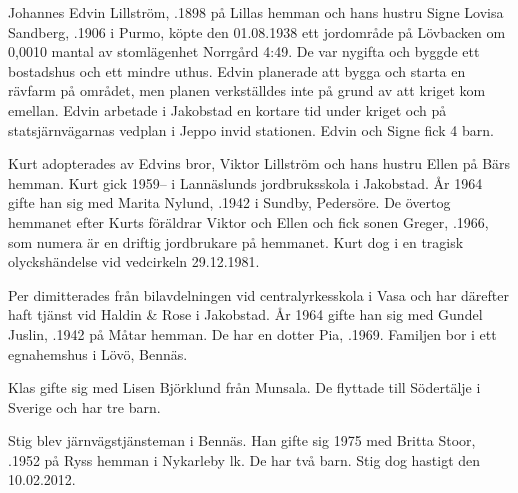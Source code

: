 

\jhvspace{}



Johannes Edvin Lillström, .1898 på Lillas hemman och hans hustru Signe Lovisa Sandberg, .1906 i Purmo, köpte den 01.08.1938 ett jordområde på Lövbacken om 0,0010 mantal av stomlägenhet Norrgård 4:49. De var nygifta och byggde ett bostadshus och ett mindre uthus. Edvin planerade att bygga och starta en rävfarm på området, men planen verkställdes inte på grund av att kriget kom emellan. Edvin arbetade i Jakobstad en kortare tid under kriget och på statsjärnvägarnas vedplan i Jeppo invid stationen. Edvin och Signe fick 4 barn.
\begin{jhchildren}
  \item {}
  \item {}
  \item {}
  \item {}
\end{jhchildren}

Kurt adopterades av Edvins bror, Viktor Lillström och hans hustru Ellen på Bärs hemman. Kurt gick 1959--	i Lannäslunds jordbruksskola i Jakobstad. År 1964 gifte han sig med Marita Nylund, .1942 i Sundby,	Pedersöre. De övertog hemmanet efter Kurts föräldrar Viktor och Ellen och fick sonen Greger, .1966, som numera är en driftig jordbrukare på hemmanet. Kurt dog i en tragisk olyckshändelse vid vedcirkeln 29.12.1981.

Per dimitterades från bilavdelningen vid centralyrkesskola i Vasa och har därefter haft tjänst vid Haldin \& Rose i Jakobstad. År 1964 gifte han sig med Gundel Juslin, .1942 på Måtar hemman. De har en dotter Pia, .1969. Familjen bor i ett egnahemshus i Lövö, Bennäs.

Klas gifte sig med Lisen Björklund från Munsala. De flyttade till Södertälje i Sverige och har tre barn.

Stig blev järnvägstjänsteman i Bennäs. Han gifte sig 1975 med Britta Stoor, .1952 på Ryss hemman i Nykarleby lk. De har två barn. Stig dog hastigt den 10.02.2012.

